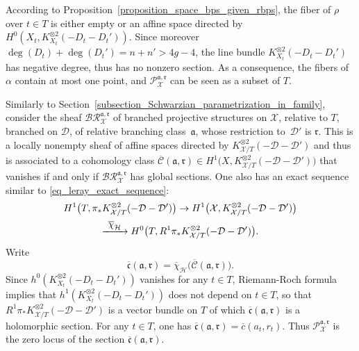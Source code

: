 \documentclass[10pt]{amsart}
\newcommand\To[1]{\mathchoice{\xrightarrow{\textstyle\kern4pt#1\kern3pt}}{\stackrel{#1}{\longrightarrow}}{}{}}
\theoremstyle{definition}
\theoremstyle{plain}
\begin{document}
According to Proposition~\ref{proposition_space_bps_given_rbps}, the fiber of $\rho$ over $t \in T$ is either empty or an affine space directed by $H^0\left(X_t, K_{X_t}^{\otimes 2}\left(-D_t-D_t'\right)\right)$.
Since moreover $\deg(D_t)+\deg(D_t')=n+n'>4g-4$, the line bundle $K_{X_t}^{\otimes 2}\left(-D_t-D_t'\right)$ has negative degree, thus has no nonzero section.
As a consequence, the fibers of $\alpha$ contain at most one point, and $\mathcal P_{\mathcal X}^{\mathfrak a, \mathfrak r}$ can be seen as a subset of $T$.

Similarly to Section~\ref{subsection_Schwarzian_parametrization_in_family}, consider the sheaf $\mathcal B \mathcal R_{\mathcal X}^{\mathfrak a, \mathfrak r}$ of branched projective structures on $\mathcal X$, relative to $T$, branched on $\mathcal D$, of relative branching class~$\mathfrak a$, whose restriction to~$\mathcal D'$ is $\mathfrak r$.
This is a locally nonempty sheaf of affine spaces directed by $K_{\mathcal X/T}^{\otimes 2}(-\mathcal D-\mathcal D')$ and thus is associated to a cohomology class $\overline{\mathcal C}(\mathfrak a, \mathfrak r) \in H^1\bigl(X, K_{\mathcal X/T}^{\otimes 2}(-\mathcal D-\mathcal D')\bigr)$ that vanishes if and only if $\mathcal B \mathcal R_{\mathcal X}^{\mathfrak a, \mathfrak r}$ has global sections.
One also has an exact sequence similar to \eqref{eq_leray_exact_sequence}:
\begin{multline}\label{eq_leray_exact_sequence_rbps}
H^1\bigl(T, \pi_*K_{\mathcal X/T}^{\otimes 2}(-\mathcal D-\mathcal D')\bigr) \to H^1\big(\mathcal X, K_{\mathcal X/T}^{\otimes 2}(-\mathcal D - \mathcal D')\bigr)\\
\To{\overline \chi_{\mathcal H}} H^0\bigl(T, R^1\pi_*K_{\mathcal X/T}^{\otimes 2}(-\mathcal D - \mathcal D')\bigr).
\end{multline}
Write
\begin{equation*}
\overline{\mathfrak c}(\mathfrak a, \mathfrak r) = \overline \chi_{\mathcal H}\bigl(\overline{\mathcal C}(\mathfrak a, \mathfrak r)\bigr).
\end{equation*}
Since $h^0\left(K_{X_t}^{\otimes 2}\left(-D_t-D_t'\right)\right)$ vanishes for any $t \in T$, Riemann-Roch formula implies that $h^1\left(K_{X_t}^{\otimes 2}\left(-D_t-D_t'\right)\right)$ does not depend on $t \in T$, so that $R^1\pi_*K_{\mathcal X/T}^{\otimes 2}(-\mathcal D - \mathcal D')$ is a vector bundle on $T$ of which $\overline{\mathfrak c}(\mathfrak a, \mathfrak r)$ is a holomorphic section.
For any $t \in T$, one has $\overline{\mathfrak c}(\mathfrak a, \mathfrak r) = \overline c(a_t, r_t)$.
Thus $\mathcal P_{\mathcal X}^{\mathfrak a, \mathfrak r}$ is the zero locus of the section $\overline{\mathfrak c}(\mathfrak a, \mathfrak r)$.
\end{document}

